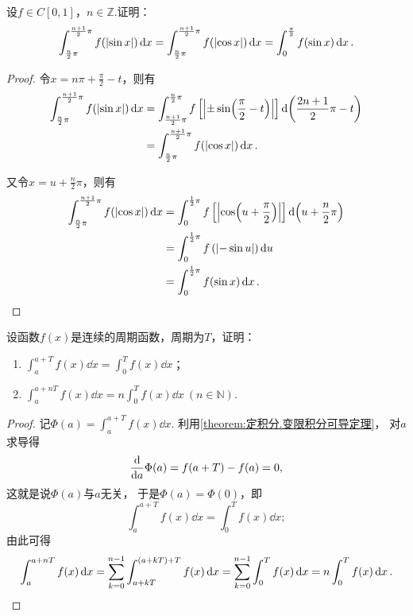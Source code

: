 \begin{example}
设\(f \in C[0,1]\)，\(n\in\mathbb{Z}\).证明：\[
\int_{\frac{n}{2} \pi}^{\frac{n+1}{2} \pi} f(\abs{\sin x}) \dd{x}
= \int_{\frac{n}{2} \pi}^{\frac{n+1}{2} \pi} f(\abs{\cos x}) \dd{x}
= \int_0^{\frac{\pi}{2}} f(\sin x) \dd{x}.
\]
\def\arraystretch{1.5}
\begin{proof}
令\(x = n\pi+\frac{\pi}{2}-t\)，则有\[
\begin{split}
\int_{\frac{n}{2} \pi}^{\frac{n+1}{2} \pi} f(\abs{\sin x}) \dd{x}
&= \int_{\frac{n+1}{2} \pi}^{\frac{n}{2} \pi} f\left[\abs{\pm\sin(\frac{\pi}{2}-t)}\right] \dd(\frac{2n+1}{2}\pi-t) \\
&= \int_{\frac{n}{2} \pi}^{\frac{n+1}{2} \pi} f(\abs{\cos x}) \dd{x}.
\end{split}
\]

又令\(x=u+\frac{n}{2} \pi\)，则有\[
\begin{split}
\int_{\frac{n}{2} \pi}^{\frac{n+1}{2} \pi} f(\abs{\cos x}) \dd{x}
&= \int_0^{\frac{1}{2}\pi} f\left[ \abs{\cos(u+\frac{\pi}{2})} \right] \dd(u+\frac{n}{2}\pi) \\
&= \int_0^{\frac{1}{2}\pi} f\left( \abs{-\sin u} \right) \dd{u} \\
&= \int_0^{\frac{1}{2}\pi} f(\sin x) \dd{x}.
\qedhere
\end{split}
\]
\end{proof}
\end{example}

\begin{example}
设函数\(f(x)\)是连续的周期函数，周期为\(T\)，证明：
\begin{enumerate}
	\item \(\int_a^{a+T} f(x) \dd{x} = \int_0^T f(x) \dd{x}\)；
	\item \(\int_a^{a+nT} f(x)\dd{x} = n\int_0^T f(x)\dd{x}\ (n \in \mathbb{N})\).
\end{enumerate}
\begin{proof}
记\(\Phi(a) = \int_a^{a+T} f(x) \dd{x}\).
利用\cref{theorem:定积分.变限积分可导定理}，
对\(a\)求导得\[
	\dv{a} \Phi(a) = f(a+T) - f(a) = 0,
\]
这就是说\(\Phi(a)\)与\(a\)无关，
于是\(\Phi(a) = \Phi(0)\)，即\[
	\int_a^{a+T} f(x) \dd{x} = \int_0^T f(x) \dd{x};
\]
由此可得\[
	\int_a^{a+nT} f(x)\dd{x}
	= \sum_{k=0}^{n-1} \int_{a+kT}^{(a+kT)+T} f(x) \dd{x}
	= \sum_{k=0}^{n-1} \int_0^T f(x) \dd{x}
	= n \int_0^T f(x) \dd{x}.
	\qedhere
\]
\end{proof}
\end{example}

